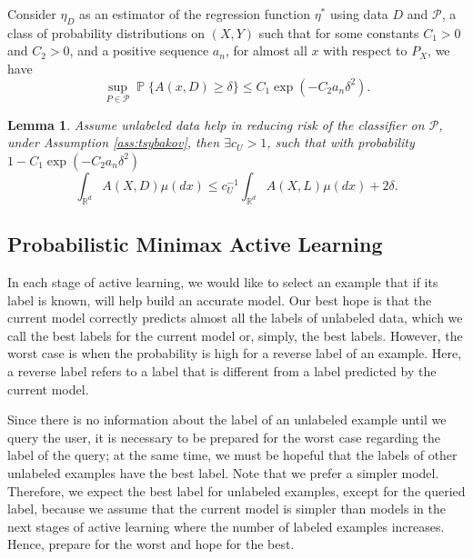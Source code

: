 \documentclass[10pt,twocolumn]{IEEEtran}
\newtheorem{lemma}{Lemma}
\DeclareMathOperator{\P}{\mathbb{P}}
\begin{document}
	\begin{assumption} \label{ass:tsybakov}
		Consider $\eta_D$ as an estimator of the regression function $\eta^*$ using data $D$ and $\mathcal{P}$, a class of probability distributions on $(X, Y)$ such that for some constants $C_1 > 0$ and $C_2 > 0$, and a positive sequence $a_n$, for almost all $x$ with respect to $P_X$, we have
		\begin{equation}
			\sup_{P \in \mathcal{P}} \P\{A(x, D) \ge \delta\} \le C_1 \exp(-C_2 a_n \delta^2).
		\end{equation}
	\end{assumption}
	
	\begin{lemma} \label{lem:unlabeled-benefit}
		Assume unlabeled data help in reducing risk of the classifier on $\mathcal{P}$, under Assumption \ref{ass:tsybakov}, then $\exists c_U > 1$, such that with probability $1 - C_1 \exp(-C_2 a_n \delta^2)$
		\begin{equation}
			\int_{\mathbb{R}^d} A(X, D) \mu(dx) \le c_U^{-1} \int_{\mathbb{R}^d} A(X, L) \mu(dx) + 2\delta.
		\end{equation}
	\end{lemma}
	
	\subsection{Probabilistic Minimax Active Learning}
	
	In each stage of active learning, we would like to select an example that if its label is known, will help build an accurate model. Our best hope is that the current model correctly predicts almost all the labels of unlabeled data, which we call the best labels for the current model or, simply, the best labels. However, the worst case is when the probability is high for a reverse label of an example. Here, a reverse label refers to a label that is different from a label predicted by the current model.
	
	Since there is no information about the label of an unlabeled example until we query the user, it is necessary to be prepared for the worst case regarding the label of the query; at the same time, we must be hopeful that the labels of other unlabeled examples have the best label. Note that we prefer a simpler model. Therefore, we expect the best label for unlabeled examples, except for the queried label, because we assume that the current model is simpler than models in the next stages of active learning where the number of labeled examples increases. Hence, prepare for the worst and hope for the best.
	
\end{document}
